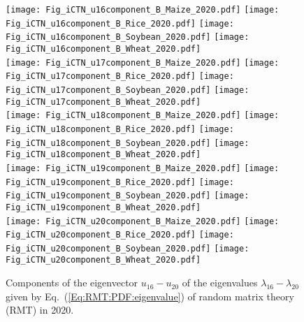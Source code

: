 \documentclass[preprint,3p,times,sort&compress]{elsarticle}
\begin{document}
 \begin{figure}[h!]
      \centering
      \texttt{[image: Fig\_iCTN\_u16component\_B\_Maize\_2020.pdf]}
      \texttt{[image: Fig\_iCTN\_u16component\_B\_Rice\_2020.pdf]}
      \texttt{[image: Fig\_iCTN\_u16component\_B\_Soybean\_2020.pdf]}
      \texttt{[image: Fig\_iCTN\_u16component\_B\_Wheat\_2020.pdf]}
      \\
      \texttt{[image: Fig\_iCTN\_u17component\_B\_Maize\_2020.pdf]}
      \texttt{[image: Fig\_iCTN\_u17component\_B\_Rice\_2020.pdf]}
      \texttt{[image: Fig\_iCTN\_u17component\_B\_Soybean\_2020.pdf]}
      \texttt{[image: Fig\_iCTN\_u17component\_B\_Wheat\_2020.pdf]}
      \\
      \texttt{[image: Fig\_iCTN\_u18component\_B\_Maize\_2020.pdf]}
      \texttt{[image: Fig\_iCTN\_u18component\_B\_Rice\_2020.pdf]}
      \texttt{[image: Fig\_iCTN\_u18component\_B\_Soybean\_2020.pdf]}
      \texttt{[image: Fig\_iCTN\_u18component\_B\_Wheat\_2020.pdf]}
      \\
      \texttt{[image: Fig\_iCTN\_u19component\_B\_Maize\_2020.pdf]}
      \texttt{[image: Fig\_iCTN\_u19component\_B\_Rice\_2020.pdf]}
      \texttt{[image: Fig\_iCTN\_u19component\_B\_Soybean\_2020.pdf]}
      \texttt{[image: Fig\_iCTN\_u19component\_B\_Wheat\_2020.pdf]}
      \\
      \texttt{[image: Fig\_iCTN\_u20component\_B\_Maize\_2020.pdf]}
      \texttt{[image: Fig\_iCTN\_u20component\_B\_Rice\_2020.pdf]}
      \texttt{[image: Fig\_iCTN\_u20component\_B\_Soybean\_2020.pdf]}
      \texttt{[image: Fig\_iCTN\_u20component\_B\_Wheat\_2020.pdf]}
      \caption{Components of the eigenvector $u_{16}-u_{20}$ of the eigenvalues $\lambda_{16}-\lambda_{20}$ given by Eq.~(\ref{Eq:RMT:PDF:eigenvalue}) of random matrix theory (RMT) in 2020.}
    \label{Fig:iCTN:PDF:eigenvalue:16-20:2020}
\end{figure}
\end{document}
